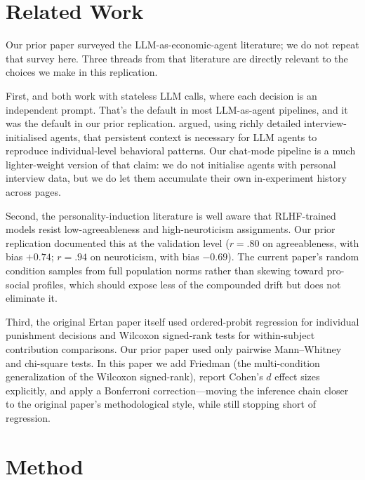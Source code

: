 \documentclass[12pt, a4paper]{article}
\begin{document}
\section{Related Work}

Our prior paper surveyed the LLM-as-economic-agent literature; we do not repeat that survey here. Three threads from that literature are directly relevant to the choices we make in this replication.

First, \citet{horton2023homo} and \citet{aher2023turing} both work with stateless LLM calls, where each decision is an independent prompt. That's the default in most LLM-as-agent pipelines, and it was the default in our prior replication. \citet{park2024generative} argued, using richly detailed interview-initialised agents, that persistent context is necessary for LLM agents to reproduce individual-level behavioral patterns. Our chat-mode pipeline is a much lighter-weight version of that claim: we do not initialise agents with personal interview data, but we do let them accumulate their own in-experiment history across pages.

Second, the personality-induction literature \citep{serapio2023personality, jiang2024personallm} is well aware that RLHF-trained models resist low-agreeableness and high-neuroticism assignments. Our prior replication documented this at the validation level ($r=.80$ on agreeableness, with bias $+0.74$; $r=.94$ on neuroticism, with bias $-0.69$). The current paper's random condition samples from full population norms rather than skewing toward pro-social profiles, which should expose less of the compounded drift but does not eliminate it.

Third, the original Ertan paper itself used ordered-probit regression for individual punishment decisions and Wilcoxon signed-rank tests for within-subject contribution comparisons. Our prior paper used only pairwise Mann--Whitney and chi-square tests. In this paper we add Friedman (the multi-condition generalization of the Wilcoxon signed-rank), report Cohen's $d$ effect sizes explicitly, and apply a Bonferroni correction---moving the inference chain closer to the original paper's methodological style, while still stopping short of regression.

\section{Method}
\end{document}
